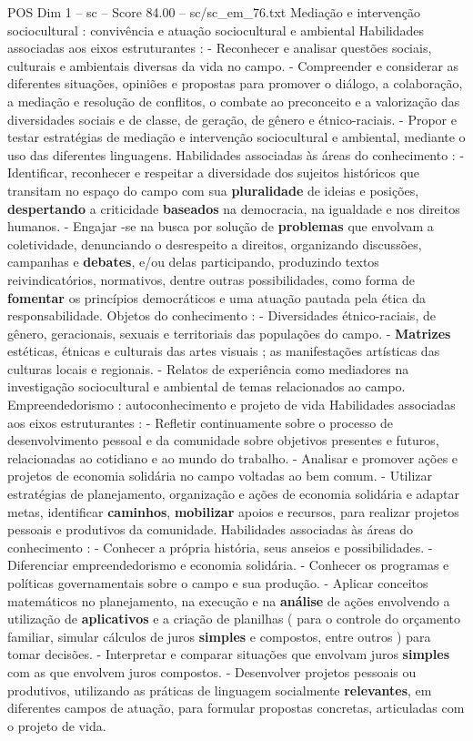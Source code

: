 \begin{textsample}{POS Dim 1 – sc – Score 84.00 – sc/sc\_em\_76.txt}
Mediação e intervenção sociocultural : convivência e atuação sociocultural e ambiental Habilidades associadas aos eixos estruturantes : - Reconhecer e analisar questões sociais, culturais e ambientais diversas da vida no campo. - Compreender e considerar as diferentes situações, opiniões e propostas para promover o diálogo, a colaboração, a mediação e resolução de conflitos, o combate ao preconceito e a valorização das diversidades sociais e de classe, de geração, de gênero e étnico-raciais. - Propor e testar estratégias de mediação e intervenção sociocultural e ambiental, mediante o uso das diferentes linguagens.
Habilidades associadas às áreas do conhecimento : - Identificar, reconhecer e respeitar a diversidade dos sujeitos históricos que transitam no espaço do campo com sua \textbf{pluralidade} de ideias e posições, \textbf{despertando} a criticidade \textbf{baseados} na democracia, na igualdade e nos direitos humanos. - Engajar -se na busca por solução de \textbf{problemas} que envolvam a coletividade, denunciando o desrespeito a direitos, organizando discussões, campanhas e \textbf{debates}, e/ou delas participando, produzindo textos reivindicatórios, normativos, dentre outras possibilidades, como forma de \textbf{fomentar} os princípios democráticos e uma atuação pautada pela ética da responsabilidade.
Objetos do conhecimento : - Diversidades étnico-raciais, de gênero, geracionais, sexuais e territoriais das populações do campo. - \textbf{Matrizes} estéticas, étnicas e culturais das artes visuais ; as manifestações artísticas das culturas locais e regionais. - Relatos de experiência como mediadores na investigação sociocultural e ambiental de temas relacionados ao campo.
Empreendedorismo : autoconhecimento e projeto de vida Habilidades associadas aos eixos estruturantes : - Refletir continuamente sobre o processo de desenvolvimento pessoal e da comunidade sobre objetivos presentes e futuros, relacionadas ao cotidiano e ao mundo do trabalho. - Analisar e promover ações e projetos de economia solidária no campo voltadas ao bem comum. - Utilizar estratégias de planejamento, organização e ações de economia solidária e adaptar metas, identificar \textbf{caminhos}, \textbf{mobilizar} apoios e recursos, para realizar projetos pessoais e produtivos da comunidade.
Habilidades associadas às áreas do conhecimento : - Conhecer a própria história, seus anseios e possibilidades. - Diferenciar empreendedorismo e economia solidária. - Conhecer os programas e políticas governamentais sobre o campo e sua produção. - Aplicar conceitos matemáticos no planejamento, na execução e na \textbf{análise} de ações envolvendo a utilização de \textbf{aplicativos} e a criação de planilhas ( para o controle do orçamento familiar, simular cálculos de juros \textbf{simples} e compostos, entre outros ) para tomar decisões. - Interpretar e comparar situações que envolvam juros \textbf{simples} com as que envolvem juros compostos. - Desenvolver projetos pessoais ou produtivos, utilizando as práticas de linguagem socialmente \textbf{relevantes}, em diferentes campos de atuação, para formular propostas concretas, articuladas com o projeto de vida.

\end{textsample}
